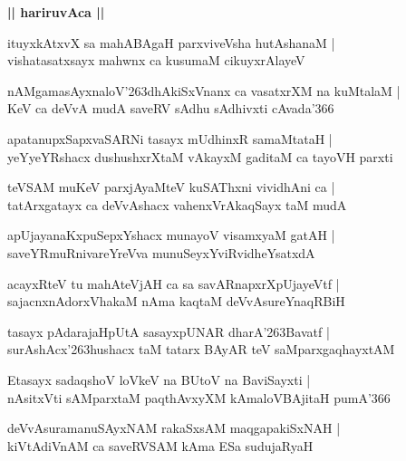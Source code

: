 \documentclass[twoside,12pt,openright]{book}
\def\S{\char'263}
\newcounter{shloka}[chapter]
\def\uvaca#1{\centerline{{\large\textbf{#1}}}}
\begin{document}
\uvaca{|| hariruvAca ||}

\begin{shloka}%
ituyxkAtxvX sa mahABAgaH parxviveVsha hutAshanaM |\\
vishatasatxsayx mahwnx ca kusumaM cikuyxrAlayeV 
\end{shloka}

\begin{shloka}%
nAMgamasAyxnaloV\S dhAkiSxVnanx ca vasatxrXM na kuMtalaM |\\
KeV ca deVvA mudA saveRV sAdhu sAdhivxti cAvada\char'366
\end{shloka}

\begin{shloka}%
apatanupxSapxvaSARNi tasayx mUdhinxR samaMtataH |\\
yeYyeYRshacx dushushxrXtaM vAkayxM gaditaM ca tayoVH parxti
\end{shloka}

\begin{shloka}%
teVSAM muKeV parxjAyaMteV kuSAThxni vividhAni ca |\\
tatArxgatayx ca deVvAshacx vahenxVrAkaqSayx taM mudA 
\end{shloka}

\begin{shloka}%
apUjayanaKxpuSepxYshacx munayoV visamxyaM gatAH |\\
saveYRmuRnivareYreVva munuSeyxYviRvidheYsatxdA
\end{shloka}

\begin{shloka}%
acayxRteV tu mahAteVjAH ca sa savARnapxrXpUjayeVtf |\\
sajacnxnAdorxVhakaM nAma kaqtaM deVvAsureYnaqRBiH 
\end{shloka}

\begin{shloka}%
tasayx pAdarajaHpUtA sasayxpUNAR dharA\S Bavatf |\\
surAshAcx\S hushacx taM tatarx BAyAR teV saMparxgaqhayxtAM 
\end{shloka}

\begin{shloka}%
Etasayx sadaqshoV loVkeV na BUtoV na BaviSayxti |\\
nAsitxVti sAMparxtaM paqthAvxyXM kAmaloVBAjitaH pumA\char'366 
\end{shloka}

\begin{shloka}%
deVvAsuramanuSAyxNAM rakaSxsAM maqgapakiSxNAH |\\
kiVtAdiVnAM ca saveRVSAM kAma ESa sudujaRyaH 
\end{shloka}
\end{document}
